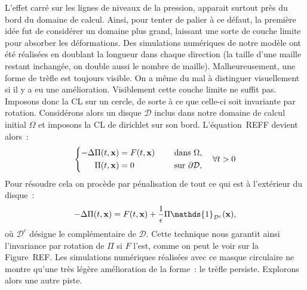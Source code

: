 \documentclass[main.tex]{subfiles}
\begin{document}
L'effet carré sur les lignes de niveaux de la pression, apparait surtout près du bord du domaine de calcul. Ainsi, pour tenter de palier à ce défaut, la première idée fut de considérer un domaine plus grand, laissant une sorte de couche limite pour absorber les déformations. Des simulations numériques de notre modèle ont été réalisées en doublant la longueur dans chaque direction (la taille d'une maille restant inchangée, on double aussi le nombre de maille). Malheureusement, une forme de trèfle est toujours visible. On a même du mal à distinguer visuellement si il y a eu une amélioration. Visiblement cette couche limite ne suffit pas. Imposons donc la CL sur un cercle, de sorte à ce que celle-ci soit invariante par rotation. Considérons alors un disque $\mathcal{D}$ inclus dans notre domaine de calcul initial $\Omega$ et imposons la CL de dirichlet sur son bord. L'équation~REFF devient alors~: 
\begin{equation}\label{eq:pression_iter1_mask}
\left\{
\begin{aligned}
-\Delta \Pi(t,\mathbf{x}) &= F(t,\mathbf{x}) & \quad \textrm{ dans }  \Omega , \\
\Pi(t,\mathbf{x}) &=0 & \quad \textrm{ sur  } \partial\mathcal{D},
\end{aligned}
\right. \quad \forall t>0
\end{equation}
Pour résoudre cela on procède par pénalisation de tout ce qui est à l'extérieur du disque~:
\begin{equation}
- \Delta \Pi(t,\vecx) = F(t,\vecx) + \frac{1}{\epsilon} \Pi \mathds{1}_{\mathcal{D}^c}(\vecx),
\end{equation}
où $\mathcal{D}^c$ désigne le complémentaire de $\mathcal{D}$. Cette technique nous garantit ainsi l'invariance par rotation de $\Pi$ si $F$ l'est, comme on peut le voir sur la Figure~REF. Les simulations numériques réalisées avec ce masque circulaire ne montre qu'une très légère amélioration  de la forme~: le trèfle persiste. 
Explorons alors une autre piste. 
\end{document}
